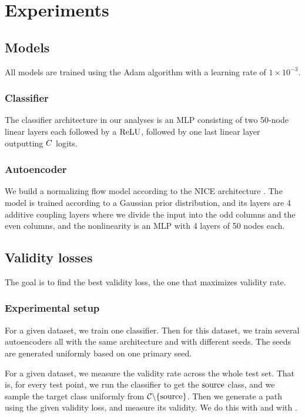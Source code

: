 \documentclass[../main.tex]{subfiles}
\begin{document}
\chapter{Experiments}

\section{Models}

All models are trained using the Adam algorithm \cite{kingmaAdam2014} with a learning rate of $1 \times 10^{-3}$.

\subsection{Classifier}

The classifier architecture in our analyses is an MLP consisting of two 50-node linear layers each followed by a $\text{ReLU}$, followed by one last linear layer outputting $C$ logits.

\subsection{Autoencoder}

We build a normalizing flow model according to the NICE architecture \cite{dinhNICE2015}.
The model is trained according to a Gaussian prior distribution, and its layers are 4 additive coupling layers where we divide the input into the odd columns and the even columns, and the nonlinearity is an MLP with 4 layers of 50 nodes each.

\section{Validity losses}

The goal is to find the best validity loss, the one that maximizes validity rate.

\subsection{Experimental setup}

For a given dataset, we train one classifier.
Then for this dataset, we train several autoencoders all with the same architecture and with different seeds.
The seeds are generated uniformly based on one primary seed.

For a given dataset, we measure the validity rate across the whole test set.
That is, for every test point, we run the classifier to get the $\mathrm{source}$ class, and we sample the target class uniformly from $\mathcal{C} \backslash \{\mathrm{source}\}$.
Then we generate a path using the given validity loss, and measure its validity.
We do this with \ls{} and with \revise{}.
\end{document}
